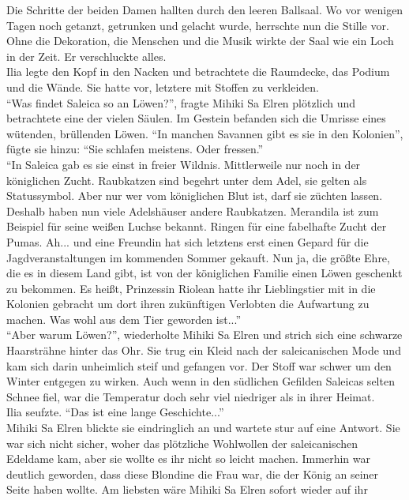 Die Schritte der beiden Damen hallten durch den leeren Ballsaal. Wo vor wenigen Tagen noch getanzt, 
getrunken und gelacht wurde, herrschte nun die Stille vor. Ohne die Dekoration, die Menschen und 
die Musik wirkte der Saal wie ein Loch in der Zeit. Er verschluckte alles.\\
Ilia legte den Kopf in den Nacken und betrachtete die Raumdecke, das Podium und die Wände. Sie 
hatte vor, letztere mit Stoffen zu verkleiden.\\
``Was findet Saleica so an Löwen?'', fragte Mihiki Sa Elren plötzlich und betrachtete eine der 
vielen Säulen. Im Gestein befanden sich die Umrisse eines wütenden, brüllenden Löwen. ``In manchen 
Savannen gibt es sie in den Kolonien'', fügte sie hinzu: ``Sie schlafen meistens. Oder fressen.''\\
``In Saleica gab es sie einst in freier Wildnis. Mittlerweile nur noch in der königlichen Zucht. 
Raubkatzen sind begehrt unter dem Adel, sie gelten als Statussymbol. Aber nur wer vom königlichen 
Blut ist, darf sie züchten lassen. Deshalb haben nun viele Adelshäuser andere Raubkatzen. Merandila 
ist zum Beispiel für seine weißen Luchse bekannt. Ringen für eine fabelhafte Zucht der Pumas. Ah... 
und eine Freundin hat sich letztens erst einen Gepard für die Jagdveranstaltungen im kommenden 
Sommer gekauft. Nun ja, die größte Ehre, die es in diesem Land gibt, ist von der königlichen 
Familie einen Löwen geschenkt zu bekommen. Es heißt, Prinzessin Riolean hatte ihr Lieblingstier mit 
in die Kolonien gebracht um dort ihren zukünftigen Verlobten die Aufwartung zu machen. Was wohl aus 
dem Tier geworden ist...''\\
``Aber warum Löwen?'', wiederholte Mihiki Sa Elren und strich sich eine schwarze Haarsträhne hinter 
das Ohr. Sie trug ein Kleid nach der saleicanischen Mode und kam sich darin unheimlich steif und 
gefangen vor. Der Stoff war schwer um den Winter entgegen zu wirken. Auch wenn in den südlichen 
Gefilden Saleicas selten Schnee fiel, war die Temperatur doch sehr viel niedriger als in ihrer 
Heimat.\\
Ilia seufzte. ``Das ist eine lange Geschichte...''\\
Mihiki Sa Elren blickte sie eindringlich an und wartete stur auf eine Antwort. Sie war sich nicht 
sicher, woher das plötzliche Wohlwollen der saleicanischen Edeldame kam, aber sie wollte es ihr 
nicht so leicht machen. Immerhin war deutlich geworden, dass diese Blondine die Frau war, die 
der König an seiner Seite haben wollte. Am liebsten wäre Mihiki Sa Elren sofort wieder auf ihr 
